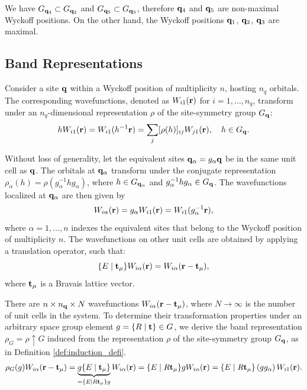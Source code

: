 \begin{example} \label{ex:maximal_wyckpos_example}
We have $G_{{\vb{q}}_4} \subset G_{{\vb{q}}_2}$ and $G_{{\vb{q}}_5} \subset G_{{\vb{q}}_3}$, therefore ${\vb{q}}_4$ and ${\vb{q}}_5$ are non-maximal Wyckoff positions. On the other hand, the Wyckoff positions ${\vb{q}}_1$, ${\vb{q}}_2$, ${\vb{q}}_3$ are maximal. %
\end{example}

\subsection{Band Representations}

Consider a site \({\vb{q}}\) within a Wyckoff position of multiplicity \(n\), hosting \(n_q\) orbitals. The corresponding wavefunctions, denoted as \(W_{i1}({\vb{r}})\) for \(i = 1, \ldots, n_q\), transform under an \(n_q\)-dimensional representation \(\rho\) of the site-symmetry group \(G_{\vb{q}}\):
\begin{equation} \label{eq:gWi1_nq_rep}
h W_{i1}({\vb{r}}) = W_{i1}(h^{-1} {\vb{r}}) = \sum_{j} [\rho(h)]_{ij} W_{j1}({\vb{r}}), \quad h \in G_{\vb{q}}.
\end{equation}

Without loss of generality, let the equivalent sites \({\vb{q}}_\alpha = g_{\alpha} {\vb{q}}\) be in the same unit cell as \({\vb{q}}\). The orbitals at \({\vb{q}}_\alpha\) transform under the conjugate representation \(\rho_\alpha(h) = \rho(g_\alpha^{-1} h g_\alpha)\), where \(h \in G_{{\vb{q}}_\alpha}\) and \(g_\alpha^{-1} h g_\alpha \in G_{\vb{q}}\). The wavefunctions localized at \({\vb{q}}_\alpha\) are then given by
\begin{equation} \label{eq:Wialpha_galpha_action}
W_{i\alpha}({\vb{r}}) = g_\alpha W_{i1}({\vb{r}}) = W_{i1}(g_\alpha^{-1} {\vb{r}}),
\end{equation}
where \(\alpha = 1, \ldots, n\) indexes the equivalent sites that belong to the Wyckoff position of multiplicity \(n\). The wavefunctions on other unit cells are obtained by applying a translation operator, such that:
\begin{equation} \label{eq:translated_Wialpha}
\{ E \mid {\vb{t}}_\mu \} W_{i\alpha}({\vb{r}}) = W_{i\alpha}({\vb{r}}-{\vb{t}}_\mu),
\end{equation}
where ${\vb{t}}_\mu$ is a Bravais lattice vector.

There are \(n \times n_{\vb{q}} \times N\) wavefunctions \(W_{i\alpha}({\vb{r}} - {\vb{t}}_\mu)\), where \(N \to \infty\) is the number of unit cells in the system. To determine their transformation properties under an arbitrary space group element \(g = \{ R \mid {\vb{t}} \} \in G\), we derive the band representation \(\rho_G = \rho \uparrow G\) induced from the representation \(\rho\) of the site-symmetry group \(G_{\vb{q}}\), as in Definition \ref{def:induction_defi}.
\begin{equation} \label{eq:induced_rho_G_wannier_step1}
\rho_G(g) W_{i\alpha}({\vb{r}}-{\vb{t}}_\mu) =
\underbrace{g \{ E \mid {\vb{t}}_\mu \}}_{= \{ E \mid R{\vb{t}}_\mu \} g} W_{i\alpha} ({\vb{r}}) =
\{ E \mid R{\vb{t}}_\mu \} g W_{i\alpha} ({\vb{r}}) =
\{ E \mid R{\vb{t}}_\mu \} \, (g g_\alpha) \, W_{i1} ({\vb{r}}).
\end{equation}

